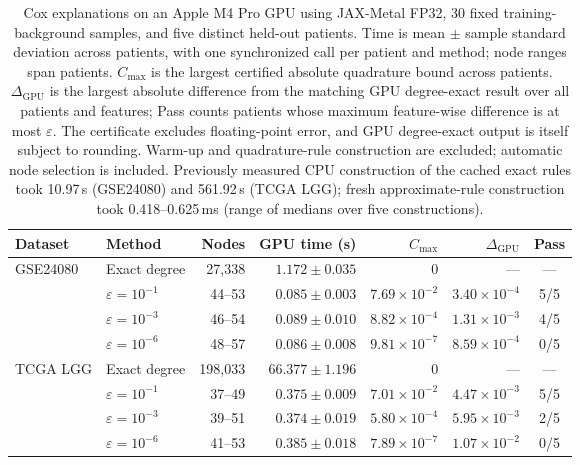 \begin{table}[t]
\centering
\small
\setlength{\tabcolsep}{4pt}
\begin{tabular}{llrrrrc}
\toprule
Dataset & Method & Nodes & GPU time (s) & $C_{\max}$ & $\Delta_{\mathrm{GPU}}$ & Pass \\
\midrule
GSE24080 & Exact degree & 27,338 & $1.172\pm0.035$ & $0$ & --- & --- \\
 & $\varepsilon=10^{-1}$ & 44--53 & $0.085\pm0.003$ & $7.69\times10^{-2}$ & $3.40\times10^{-4}$ & 5/5 \\
 & $\varepsilon=10^{-3}$ & 46--54 & $0.089\pm0.010$ & $8.82\times10^{-4}$ & $1.31\times10^{-3}$ & 4/5 \\
 & $\varepsilon=10^{-6}$ & 48--57 & $0.086\pm0.008$ & $9.81\times10^{-7}$ & $8.59\times10^{-4}$ & 0/5 \\
\midrule
TCGA LGG & Exact degree & 198,033 & $66.377\pm1.196$ & $0$ & --- & --- \\
 & $\varepsilon=10^{-1}$ & 37--49 & $0.375\pm0.009$ & $7.01\times10^{-2}$ & $4.47\times10^{-3}$ & 5/5 \\
 & $\varepsilon=10^{-3}$ & 39--51 & $0.374\pm0.019$ & $5.80\times10^{-4}$ & $5.95\times10^{-3}$ & 2/5 \\
 & $\varepsilon=10^{-6}$ & 41--53 & $0.385\pm0.018$ & $7.89\times10^{-7}$ & $1.07\times10^{-2}$ & 0/5 \\
\bottomrule
\end{tabular}
\caption{Cox explanations on an Apple M4 Pro GPU using JAX-Metal FP32,
30 fixed training-background samples, and five distinct held-out patients.
Time is mean $\pm$ sample standard deviation across patients, with one
synchronized call per patient and method; node ranges span patients.
$C_{\max}$ is the largest certified absolute quadrature bound across patients.
$\Delta_{\mathrm{GPU}}$ is the largest absolute difference from the matching
GPU degree-exact result over all patients and features; Pass counts patients
whose maximum feature-wise difference is at most $\varepsilon$.
The certificate excludes floating-point error, and GPU degree-exact output
is itself subject to rounding. Warm-up and quadrature-rule construction
are excluded; automatic node selection is included.
Previously measured CPU construction of the cached exact rules took
10.97\,s (GSE24080) and 561.92\,s (TCGA LGG); fresh approximate-rule
construction took 0.418--0.625\,ms (range of medians over five constructions).}
\label{tab:cox-high-dimensional}
\end{table}

